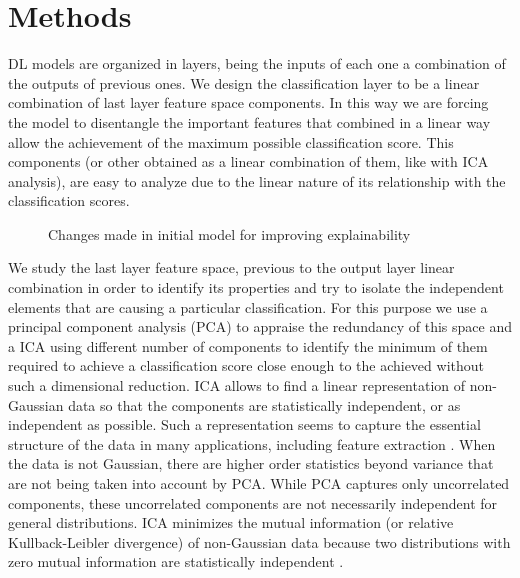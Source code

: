 \documentclass{llncs}
\begin{document}
\section{Methods}\label{sec:methods}
DL models are organized in layers, being the inputs of each one a combination of the outputs of previous ones. We design the classification layer to be a linear combination of last layer feature space components. In this way we are forcing the model to disentangle the important features that combined in a linear way allow the achievement of the maximum possible classification score. This components (or other obtained as a linear combination of them, like with ICA analysis), are easy to analyze due to the linear nature of its relationship with the classification scores.

\begin{figure}
	\centering
	\caption{Changes made in initial model for improving explainability}  
	\label{fig:models} 
\end{figure}

We study the last layer feature space, previous to the output layer linear combination in order to identify its properties and try to isolate the independent elements that are causing a particular classification. For this purpose we use a principal component analysis (PCA)  \cite{pearson1901principal} to appraise the redundancy of this space and a ICA \cite{hyvarinen2000independent} using different number of components to identify the minimum of them required to achieve a classification score close enough to the achieved without such a dimensional reduction.  ICA allows to find a linear representation of non-Gaussian data so that the components are statistically independent, or as independent as possible. Such a representation seems to capture the essential structure of the data in many applications, including feature extraction \cite{hyvarinen2000independent}. When the data is not Gaussian, there are higher order statistics beyond variance that are not being taken into account by PCA. While PCA captures only uncorrelated components, these uncorrelated components are not necessarily independent for general distributions. ICA minimizes the mutual information (or relative Kullback-Leibler divergence) of non-Gaussian data because two distributions with zero mutual information are statistically independent \cite{comon1992independent}. 
\end{document}
